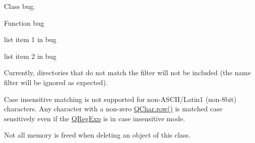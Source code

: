 
\begin{DoxyRefList}
\item[Class \mbox{\hyperlink{class_bug}{Bug}} ]\label{bug__bug000004}%
%
Class bug.  
\item[Member \mbox{\hyperlink{class_bug_a1f720954dd97cd1203e80501a6eae74c}{Bug::foo}} ()]\label{bug__bug000005}%
%
Function bug
\begin{DoxyItemize}
\item list item 1 in bug
\item list item 2 in bug 
\end{DoxyItemize}
\item[Member \mbox{\hyperlink{class_q_dir_aec96bf79103196eefd2a38ff74aeadd0}{Q\+Dir::set\+Match\+All\+Dirs}} (bool)]\label{bug__bug000002}%
%
Currently, directories that do not match the filter will not be included (the name filter will be ignored as expected). 
\item[Class \mbox{\hyperlink{class_q_reg_exp}{Q\+Reg\+Exp}} ]\label{bug__bug000003}%
%
Case insensitive matching is not supported for non-\/\+A\+S\+C\+I\+I/\+Latin1 (non-\/8bit) characters. Any character with a non-\/zero \mbox{\hyperlink{class_q_char_a8f987c65692f95eebc84bf687ea92aff}{Q\+Char.\+row()}} is matched case sensitively even if the \mbox{\hyperlink{class_q_reg_exp}{Q\+Reg\+Exp}} is in case insensitive mode. 
\item[Class \mbox{\hyperlink{class_some_nice_class}{Some\+Nice\+Class}} ]\label{bug__bug000001}%
%
Not all memory is freed when deleting an object of this class. 
\end{DoxyRefList}